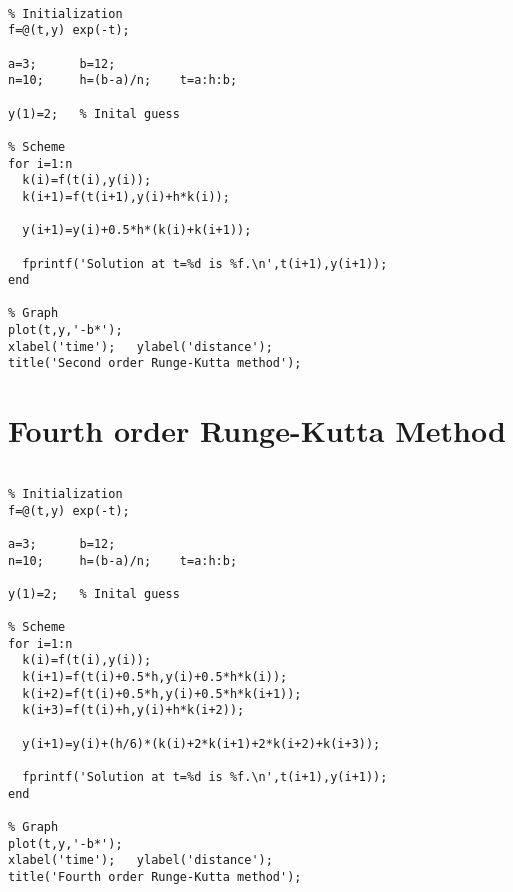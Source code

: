 \begin{verbatim}

% Initialization
f=@(t,y) exp(-t);

a=3;      b=12;
n=10;     h=(b-a)/n;    t=a:h:b;

y(1)=2;   % Inital guess

% Scheme
for i=1:n
  k(i)=f(t(i),y(i));
  k(i+1)=f(t(i+1),y(i)+h*k(i));

  y(i+1)=y(i)+0.5*h*(k(i)+k(i+1));

  fprintf('Solution at t=%d is %f.\n',t(i+1),y(i+1));
end

% Graph
plot(t,y,'-b*');
xlabel('time');   ylabel('distance');
title('Second order Runge-Kutta method');

\end{verbatim}
\clearpage

\section{Fourth order Runge-Kutta Method}

\begin{verbatim}

% Initialization
f=@(t,y) exp(-t);

a=3;      b=12;
n=10;     h=(b-a)/n;    t=a:h:b;

y(1)=2;   % Inital guess

% Scheme
for i=1:n
  k(i)=f(t(i),y(i));
  k(i+1)=f(t(i)+0.5*h,y(i)+0.5*h*k(i));
  k(i+2)=f(t(i)+0.5*h,y(i)+0.5*h*k(i+1));
  k(i+3)=f(t(i)+h,y(i)+h*k(i+2));

  y(i+1)=y(i)+(h/6)*(k(i)+2*k(i+1)+2*k(i+2)+k(i+3));

  fprintf('Solution at t=%d is %f.\n',t(i+1),y(i+1));
end

% Graph
plot(t,y,'-b*');
xlabel('time');   ylabel('distance');
title('Fourth order Runge-Kutta method');
\end{verbatim}
